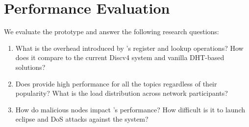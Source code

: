 
\section{Performance Evaluation}
\label{sec:eval}

We evaluate the \sysname prototype and answer the following research questions:
\begin{enumerate}
    \item What is the overhead introduced by \sysname's register and lookup operations? How does it compare to the current Discv4 system and vanilla DHT-based solutions?
    \item Does \sysname provide high performance for all the topics regardless of their popularity? What is the load distribution across network participants?
    \item How do malicious nodes impact \sysname’s performance? How difficult is it to launch eclipse and DoS attacks against the system?
\end{enumerate}

